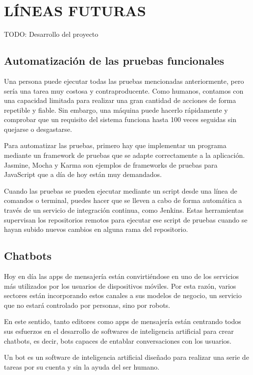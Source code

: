 \chapter{LÍNEAS FUTURAS\label{sec:lineasfuturas}}

TODO: Desarrollo del proyecto

\section{Automatización de las pruebas funcionales}

Una persona puede ejecutar todas las pruebas mencionadas anteriormente, pero sería una tarea muy costosa y contraproducente. Como humanos, contamos con una capacidad limitada para realizar una gran cantidad de acciones de forma repetible y fiable. Sin embargo, una máquina puede hacerlo rápidamente y comprobar que un requisito del sistema funciona hasta 100 veces seguidas sin quejarse o desgastarse.

Para automatizar las pruebas, primero hay que implementar un programa mediante un framework de pruebas que se adapte correctamente a la aplicación. Jasmine, Mocha y Karma son ejemplos de frameworks de pruebas para JavaScript que a día de hoy están muy demandados.

Cuando las pruebas se pueden ejecutar mediante un script desde una línea de comandos o terminal, puedes hacer que se lleven a cabo de forma automática a través de un servicio de integración continua, como Jenkins. Estas herramientas supervisan los repositorios remotos para ejecutar ese script de pruebas cuando se hayan subido nuevos cambios en alguna rama del repositorio.

\section{Chatbots}

Hoy en día las apps de mensajería están convirtiéndose en uno de los servicios más utilizados por los usuarios de dispositivos móviles. Por esta razón, varios sectores están incorporando estos canales a sus modelos de negocio, un servicio que no estará controlado por personas, sino por robots.

En este sentido, tanto editores como apps de mensajería están centrando todos sus esfuerzos en el desarrollo de softwares de inteligencia artificial para crear chatbots, es decir, bots capaces de entablar conversaciones con los usuarios.

Un bot es un software de inteligencia artificial diseñado para realizar una serie de tareas por su cuenta y sin la ayuda del ser humano.

